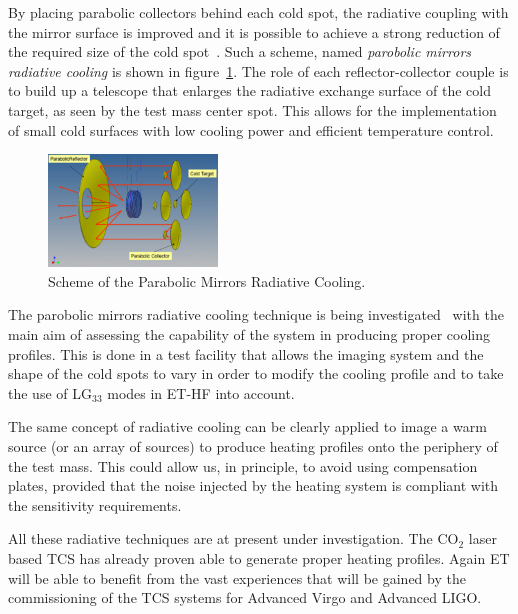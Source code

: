 By placing parabolic collectors behind each cold spot, the radiative coupling with the mirror 
surface is improved and it is possible to achieve  a strong reduction of the required size of the cold spot~\cite{tvpi10}. 
Such a scheme, named \emph{parobolic mirrors radiative cooling}  is shown in figure~\ref{Fig:Sec_Optics_TCS7}. 
The role of each reflector-collector couple is to build up a telescope that enlarges the radiative exchange surface 
of the cold target,
as seen by the test mass center spot. This allows for the implementation of
small cold surfaces with low cooling power and efficient temperature control.
\begin{figure}[!h]
\centering
\includegraphics[width=0.4\textwidth]{Sec_Optics/TCS_7b}
\caption{Scheme of the Parabolic Mirrors Radiative Cooling.}
\label{Fig:Sec_Optics_TCS7}   
\end{figure}


The parobolic mirrors radiative cooling technique is being investigated~\cite{tvpi10} with the main aim of assessing the 
capability of the system in producing proper cooling profiles. This is done in a test facility that allows the
 imaging system and the shape of the cold spots to vary in order to modify the cooling profile and to take  the use of LG$_{33}$ modes in ET-HF
 into account.

The same concept of radiative cooling can be clearly applied to image a warm source (or an array of sources) to
 produce heating profiles onto the periphery of the test mass. This could allow us, in principle, to avoid using compensation 
 plates, provided that the noise injected by the heating system is compliant with the sensitivity requirements.

All these radiative techniques are at present under investigation. The CO$_2$ laser based 
TCS has already proven able to generate proper heating profiles.
Again ET will be able to benefit from the vast experiences that will be gained 
by the commissioning of the TCS systems for Advanced Virgo and Advanced LIGO.

